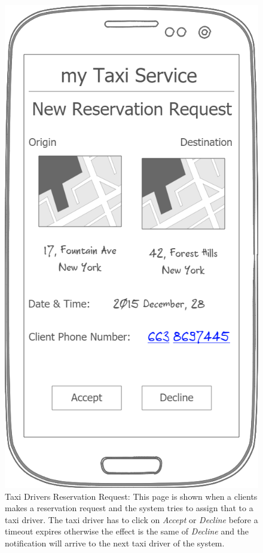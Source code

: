 \documentclass[a4paper]{article}
\begin{document}
\begin{figure}[H]
\includegraphics[width=\mockupWidth]{Mockup-TaxiDriversReservationRequest}
\centering
\caption[Taxi Drivers Reservation Request]{Taxi Drivers Reservation Request: \newline This page is shown when a clients makes a reservation request and the system tries to assign that to a taxi driver. The taxi driver has to click on \emph{Accept} or \emph{Decline} before a timeout expires otherwise the effect is the same of \emph{Decline} and the notification will arrive to the next taxi driver of the system.}
\label{fig:mockuptaxidriverireservationrequest}
\end{figure}
\clearpage
\end{document}
